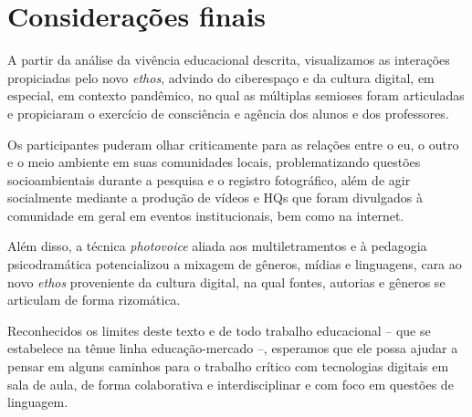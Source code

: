 \section{Considerações finais}\label{sec-consideraçõesfinais}

A partir da análise da vivência educacional descrita, visualizamos as interações propiciadas pelo novo \textit{ethos}, advindo do ciberespaço e da cultura digital, em especial, em contexto pandêmico, no qual as múltiplas semioses foram articuladas e propiciaram o exercício de consciência e agência dos alunos e dos professores.

Os participantes puderam olhar criticamente para as relações entre o eu, o outro e o meio ambiente em suas comunidades locais, problematizando questões socioambientais durante a pesquisa e o registro fotográfico, além de agir socialmente mediante a produção de vídeos e HQs que foram divulgados à comunidade em geral em eventos institucionais, bem como na internet.

Além disso, a técnica \textit{photovoice} aliada aos multiletramentos e à pedagogia psicodramática potencializou a mixagem de gêneros, mídias e linguagens, cara ao novo \textit{ethos} proveniente da cultura digital, na qual fontes, autorias e gêneros se articulam de forma rizomática.

Reconhecidos os limites deste texto e de todo trabalho educacional – que se estabelece na tênue linha educação-mercado –, esperamos que ele possa ajudar a pensar em alguns caminhos para o trabalho crítico com tecnologias digitais em sala de aula, de forma colaborativa e interdisciplinar e com foco em questões de linguagem.
